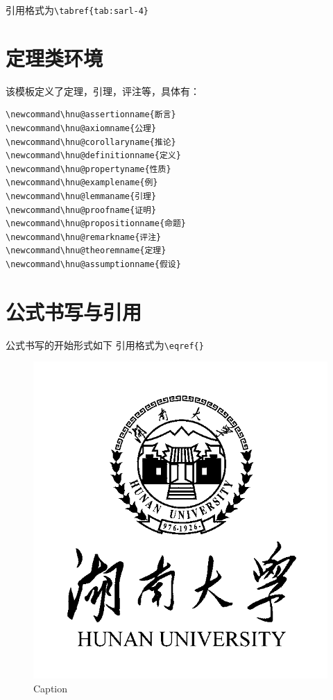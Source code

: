 引用格式为\lstinline!\tabref{tab:sarl-4}!

\section{定理类环境}
该模板定义了定理，引理，评注等，具体有：
\begin{lstlisting}
\newcommand\hnu@assertionname{断言}
\newcommand\hnu@axiomname{公理}
\newcommand\hnu@corollaryname{推论}
\newcommand\hnu@definitionname{定义}
\newcommand\hnu@propertyname{性质}
\newcommand\hnu@examplename{例}
\newcommand\hnu@lemmaname{引理}
\newcommand\hnu@proofname{证明}
\newcommand\hnu@propositionname{命题}
\newcommand\hnu@remarkname{评注}
\newcommand\hnu@theoremname{定理}
\newcommand\hnu@assumptionname{假设}
\end{lstlisting}

\section{公式书写与引用}
公式书写的开始形式如下
引用格式为\lstinline!\eqref{}!

\begin{figure}
    \centering
    \includegraphics{figures/hnu-logo.png}
    \caption{Caption}
    \label{fig:1}
\end{figure}

